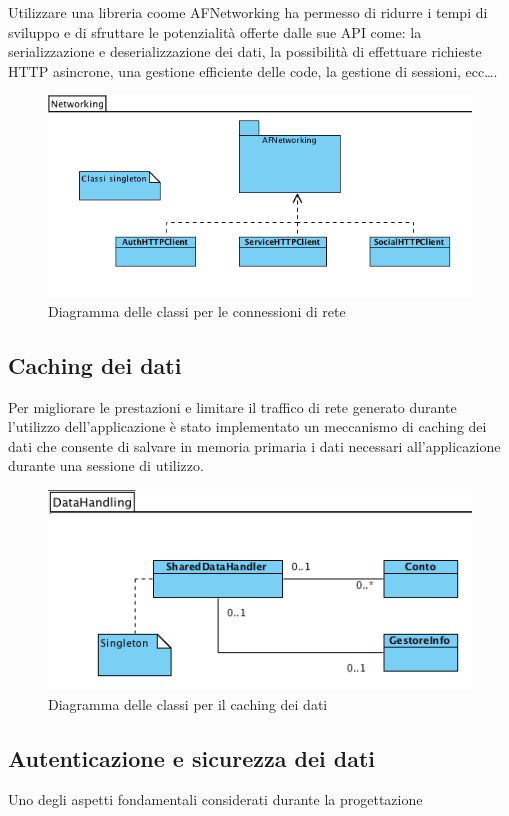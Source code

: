 Utilizzare una libreria coome AFNetworking ha permesso di ridurre i tempi di sviluppo e di sfruttare le potenzialità offerte dalle sue API come: la serializzazione e deserializzazione dei dati, la possibilità di effettuare richieste HTTP asincrone, una gestione efficiente delle code, la gestione di sessioni, ecc\dots.  

\begin{figure}[!htbp]
\centering
\includegraphics[scale=0.70]{architettura/networkingClass.png}
\caption{Diagramma delle classi per le connessioni di rete}
\end{figure}


\subsection{Caching dei dati}
Per migliorare le prestazioni e limitare il traffico di rete generato durante l'utilizzo dell'applicazione è stato implementato un meccanismo di caching dei dati che consente di salvare in memoria primaria i dati necessari all'applicazione durante una sessione di utilizzo. 

\begin{figure}[!htbp]
\centering
\includegraphics[scale=0.70]{architettura/cacheClass.png}
\caption{Diagramma delle classi per il caching dei dati}
\end{figure}

\subsection{Autenticazione e sicurezza dei dati}

Uno degli aspetti fondamentali considerati durante la progettazione  